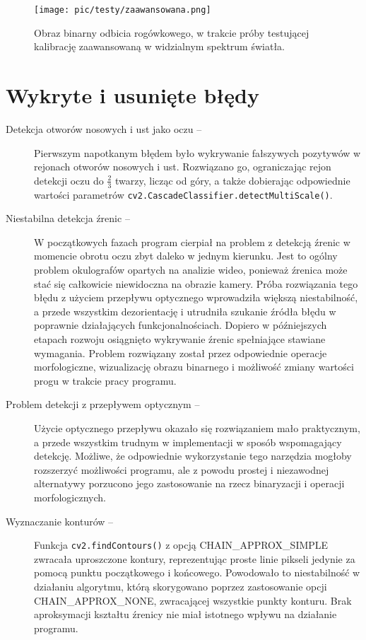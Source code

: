 \documentclass[a4paper,twoside,12pt]{book}
\begin{document}
\begin{figure}[htbp]
	\centering
	\texttt{[image: pic/testy/zaawansowana.png]}
	\caption{Obraz binarny odbicia rogówkowego, w trakcie próby testującej kalibrację zaawansowaną w widzialnym spektrum światła.}
	\label{fig:test-zaawansowana}
\end{figure}

\FloatBarrier
\section{Wykryte i usunięte błędy}
\label{sec:wykryte-i-usunięte-bledy}

\begin{description}
	\item[Detekcja otworów nosowych i ust jako oczu --] Pierwszym napotkanym błędem było wykrywanie fałszywych pozytywów w rejonach otworów nosowych i ust. Rozwiązano go, ograniczając rejon detekcji oczu do $\frac{2}{3}$ twarzy, licząc od góry, a także dobierając odpowiednie wartości parametrów \texttt{cv2.\-Cascade\-Classifier.\-detectMultiScale()}.
	\item[Niestabilna detekcja źrenic --] W początkowych fazach program cierpiał na problem z detekcją źrenic w momencie obrotu oczu zbyt daleko w jednym kierunku. Jest to ogólny problem okulografów opartych na analizie wideo, ponieważ źrenica może stać się całkowicie niewidoczna na obrazie kamery. Próba rozwiązania tego błędu z użyciem przepływu optycznego wprowadziła większą niestabilność, a przede wszystkim dezorientację i utrudniła szukanie źródła błędu w poprawnie działających funkcjonalnościach. Dopiero w późniejszych etapach rozwoju osiągnięto wykrywanie źrenic spełniające stawiane wymagania. Problem rozwiązany został przez odpowiednie operacje morfologiczne, wizualizację obrazu binarnego i możliwość zmiany wartości progu w trakcie pracy programu.
	\item[Problem detekcji z przepływem optycznym --] Użycie optycznego przepływu okazało się rozwiązaniem mało praktycznym, a przede wszystkim trudnym w implementacji w sposób wspomagający detekcję. Możliwe, że odpowiednie wykorzystanie tego narzędzia mogłoby rozszerzyć możliwości programu, ale z powodu prostej i niezawodnej alternatywy porzucono jego zastosowanie na rzecz binaryzacji i operacji morfologicznych.
	\item[Wyznaczanie konturów --] Funkcja \texttt{cv2\-.find\-Contours()} z opcją CHAIN\-\_APPROX\-\_SIMPLE zwracała uproszczone kontury, reprezentując proste linie pikseli jedynie za pomocą punktu początkowego i końcowego. Powodowało to niestabilność w działaniu algorytmu, którą skorygowano poprzez zastosowanie opcji CHAIN\-\_APPROX\-\_NONE, zwracającej wszystkie punkty konturu. Brak aproksymacji kształtu źrenicy nie miał istotnego wpływu na działanie programu.

\end{description}
\end{document}
